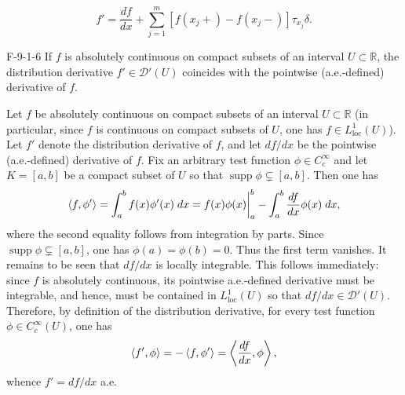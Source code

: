 \documentclass{article}
\begin{document}
	\begin{equation*}
		f' = \frac{df}{dx} + \sum_{j = 1}^{m}[f(x_{j}+) - f(x_{j}-)]\tau_{x_{j}}\delta. 
	\end{equation*}
	\begin{prb}{F-9-1-6}
		If $f$ is absolutely continuous on compact subsets of an interval $U \subset \mathbb{R}$, the distribution derivative $f' \in \mathcal{D}'(U)$ coincides with the pointwise (a.e.-defined) derivative of $f$. 
	\end{prb}
	Let $f$ be absolutely continuous on compact subsets of an interval $U \subset \mathbb{R}$ (in particular, since $f$ is continuous on compact subsets of $U$, one has $f \in L^{1}_{\text{loc}}(U)$). Let $f'$ denote the distribution derivative of $f$, and let $df/dx$ be the pointwise (a.e.-defined) derivative of $f$. Fix an arbitrary test function $\phi \in C_{c}^{\infty}$ and let $K = [a, b]$ be a compact subset of $U$ so that $\operatorname{supp}{\phi} \subsetneq [a,b]$. Then one has 
	\begin{equation*}
		\braket{f, \phi'} = \int_{a}^{b}f(x)\phi'(x)\;dx = f(x)\phi(x)\bigg|_{a}^{b} - \int_{a}^{b}\frac{df}{dx}\phi(x)\;dx, 
	\end{equation*}
	where the second equality follows from integration by parts. Since $\operatorname{supp}{\phi} \subsetneq [a,b]$, one has $\phi(a) = \phi(b) = 0$. Thus the first term vanishes. It remains to be seen that $df/dx$ is locally integrable. This follows immediately: since $f$ is absolutely continuous, its pointwise a.e.-defined derivative must be integrable, and hence, must be contained in $L^{1}_{\text{loc}}(U)$ so that $df/dx \in \mathcal{D}'(U)$. Therefore, by definition of the distribution derivative, for every test function $\phi \in C_{c}^{\infty}(U)$, one has 
	\begin{equation*}
		\braket{f', \phi} = -\braket{f, \phi'} = \left\langle \frac{df}{dx}, \phi\right\rangle, 
	\end{equation*}
	whence $f' = df/dx$ a.e.
	
\end{document}
